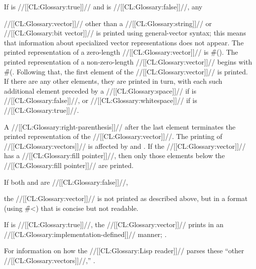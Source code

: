 \endsubsubsection%



If  is //[[CL:Glossary:true]]// 
and  is //[[CL:Glossary:false]]//,
any

//[[CL:Glossary:vector]]// 
other than a //[[CL:Glossary:string]]// or //[[CL:Glossary:bit vector]]// is printed using
general-vector syntax; this means that information
about specialized vector representations does not appear.
The printed representation of a zero-length //[[CL:Glossary:vector]]// is \f{\#()}.
The printed representation of a non-zero-length //[[CL:Glossary:vector]]// begins with \f{\#(}.
Following that, the first element of the //[[CL:Glossary:vector]]// is printed.  
If there are any other elements, they are printed in turn, with 
each such additional element preceded by
a //[[CL:Glossary:space]]// if  is //[[CL:Glossary:false]]//,
or //[[CL:Glossary:whitespace]]// if  is //[[CL:Glossary:true]]//.

A //[[CL:Glossary:right-parenthesis]]// after the last element
terminates the printed representation of the //[[CL:Glossary:vector]]//. 
The printing of //[[CL:Glossary:vectors]]// 
is affected by  and .
If the //[[CL:Glossary:vector]]// has a //[[CL:Glossary:fill pointer]]//, 
then only those elements below
the //[[CL:Glossary:fill pointer]]// are printed.



If both  and  are //[[CL:Glossary:false]]//,

the //[[CL:Glossary:vector]]// is not printed as described above,
but in a format (using \f{\#<}) that is concise but not readable.

If  is //[[CL:Glossary:true]]//,
the //[[CL:Glossary:vector]]// prints in an //[[CL:Glossary:implementation-defined]]// manner;
.


For information on how the //[[CL:Glossary:Lisp reader]]// parses these ``other //[[CL:Glossary:vectors]]//,''
\seesection\SharpsignLeftParen.

\endsubsubsection%



